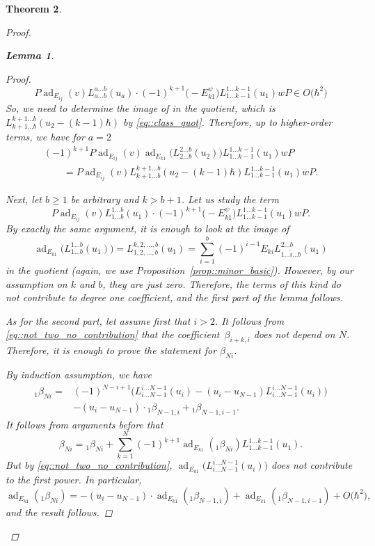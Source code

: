 \documentclass[10pt,a4paper]{amsart}
\numberwithin{equation}{section}
\newtheorem{Theorem}{Theorem}[section]
\newtheorem{Lemma}[Theorem]{Lemma}
\DeclareMathOperator{\ad}{ad}
\begin{document}
\begin{Theorem}
\begin{proof}
\begin{Lemma}
\begin{proof}
\begin{equation}
						P\ad_{E_{ij}}(v) L_{a\dots b}^{a\dots b}(u_a) \cdot (-1)^{k+1} \bigl(-E_{k1}^{\psi}\bigr) L_{1\dots k-1}^{1\dots k-1}(u_1) wP \in O\bigl(\hbar^2\bigr)
					\end{equation}
					So, we need to determine the image of  in the quotient, which is $L_{k+1\dots b}^{k+1\dots b}(u_2 - (k-1)\hbar)$ by \eqref{eq::class_quot}. Therefore, up to higher-order terms, we have for $a=2$
					\begin{gather*}
						(-1)^{k+1}P\ad_{E_{ij}}(v)\ad_{E_{k1}}\bigl(L_{2\dots b}^{2\dots b}(u_2)\bigr) L_{1\dots k-1}^{1\dots k-1}(u_1)w P \\
						\qquad=P\ad_{E_{ij}}(v) L_{k+1\dots b}^{k+1\dots b}(u_2-(k-1)\hbar) L_{1\dots k-1}^{1\dots k-1}(u_1) wP.
					\end{gather*}
					
					Next, let $b\geq 1$ be arbitrary and $k>b+1$. Let us study the term
					\[
					P\ad_{E_{ij}}(v) L_{1 \dots b}^{1\dots b}(u_1) \cdot (-1)^{k+1} \bigl(-E_{k1}^{\psi}\bigr) L_{1\dots k-1}^{1\dots k-1}(u_1) wP.
					\]
					By exactly the same argument, it is enough to look at the image of
					\[
					\ad_{E_{k1}}\bigl(L_{1\dots b}^{1\dots b}(u_1)\bigr) = L_{1,2,\dots,b}^{k,2,\dots,b}(u_1) = \sum\limits_{i=1}^b (-1)^{i-1} E_{ki} L_{1\dots \hat{i} \dots b}^{2\dots b}(u_1)
					\]
					in the quotient (again, we use Proposition~\ref{prop::minor_basic}). However, by our assumption on $k$ and $b$, they are just zero. Therefore, the terms of this kind do not contribute to degree one coefficient, and the first part of the lemma follows.
					
					As for the second part, let assume first that $i>2$. It follows from \eqref{eq::not_two_no_contribution} that the coefficient~$\beta_{i+k,i}$ does not depend on $N$. Therefore, it is enough to prove the statement for $\beta_{Ni}$.
					
					By induction assumption, we have
					\begin{align*}
							{}_1\beta_{Ni}
							={}&(-1)^{N-i+1}\bigl(L_{i\dots N-1}^{i\dots N-1}(u_i) - (u_i - u_{N-1}) L_{i \dots N-1}^{i \dots N-1}(u_i)\bigr)\\
&- (u_i - u_{N-1}) \cdot {}_1\beta_{N-1,i} + {}_1\beta_{N-1,i-1}.
					\end{align*}
					It follows from arguments before that
					\[
					\beta_{Ni} = {}_1 \beta_{Ni} + \sum\limits_{k=1}^{N}	(-1)^{k+1} \ad_{E_{k1}} ({}_1 \beta_{Ni}) L_{1\dots k-1}^{1\dots k-1}(u_1).
					\]
					But by \eqref{eq::not_two_no_contribution}, $\ad_{E_{k1}}\bigl(L_{i\dots N-1}^{i \dots N-1}(u_i)\bigr)$ does not contribute to the first power. In particular,
					\[
					\ad_{E_{k1}}({}_1 \beta_{Ni}) =- (u_i - u_{N-1})\cdot \ad_{E_{k1}}({}_1\beta_{N-1,i}) + \ad_{E_{k1}}({}_1\beta_{N-1,i-1}) + O\bigl(\hbar^2\bigr),
					\]
					and the result follows.
					

\end{proof}
\end{Lemma}
\end{proof}
\end{Theorem}
\end{document}
